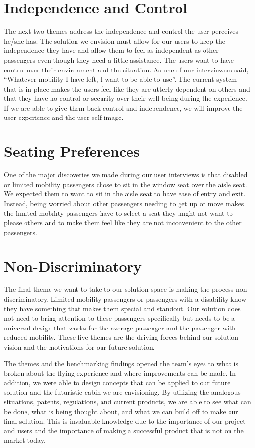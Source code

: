 \section*{Independence and Control}
The next two themes address the independence and control the user perceives he/she has.  The solution we envision must allow for our users to keep the independence they have and allow them to feel as independent as other passengers even though they need a little assistance.  The users want to have control over their environment and the situation. As one of our interviewees said, “Whatever mobility I have left, I want to be able to use”. The current system that is in place makes the users feel like they are utterly dependent on others and that they have no control or security over their well-being during the experience.  If we are able to give them back control and independence, we will improve the user experience and the user self-image. 

\section*{Seating Preferences}
One of the major discoveries we made during our user interviews is that disabled or limited mobility passengers chose to sit in the window seat over the aisle seat.  We expected them to want to sit in the aisle seat to have ease of entry and exit.  Instead, being worried about other passengers needing to get up or move makes the limited mobility passengers have to select a seat they might not want to please others and to make them feel like they are not inconvenient to the other passengers.  

\section*{Non-Discriminatory}
The final theme we want to take to our solution space is making the process non-discriminatory.  Limited mobility passengers or passengers with a disability know they have something that makes them special and standout.  Our solution does not need to bring attention to these passengers specifically but needs to be a universal design that works for the average passenger and the passenger with reduced mobility.  These five themes are the driving forces behind our solution vision and the motivations for our future solution.

The themes and the benchmarking findings opened the team’s eyes to what is broken about the flying experience and where improvements can be made.  In addition, we were able to design concepts that can be applied to our future solution and the futuristic cabin we are envisioning. By utilizing the analogous situations, patents, regulations, and current products, we are able to see what can be done, what is being thought about, and what we can build off to make our final solution.  This is invaluable knowledge due to the importance of our project and users and the importance of making a successful product that is not on the market today.  

